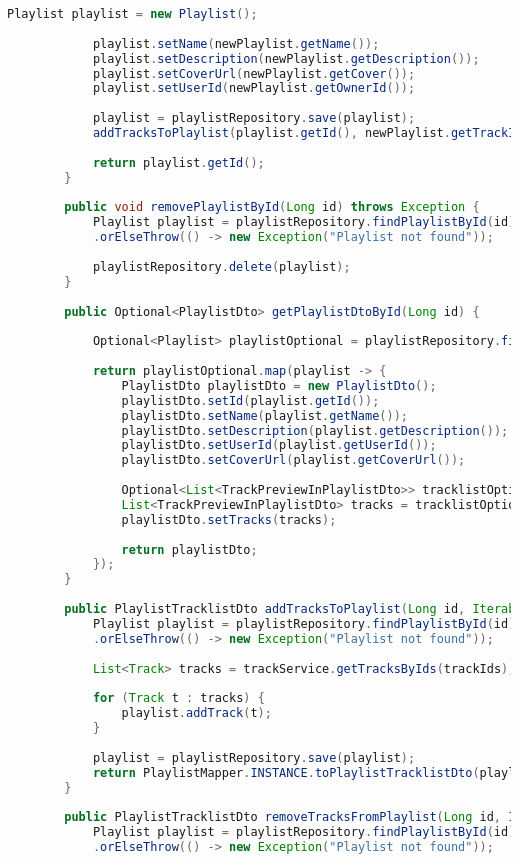 \begin{lstlisting}[language=java]
			Playlist playlist = new Playlist();
			
			playlist.setName(newPlaylist.getName());
			playlist.setDescription(newPlaylist.getDescription());
			playlist.setCoverUrl(newPlaylist.getCover());
			playlist.setUserId(newPlaylist.getOwnerId());
			
			playlist = playlistRepository.save(playlist);
			addTracksToPlaylist(playlist.getId(), newPlaylist.getTrackIds());
			
			return playlist.getId();
		}
		
		public void removePlaylistById(Long id) throws Exception {
			Playlist playlist = playlistRepository.findPlaylistById(id)
			.orElseThrow(() -> new Exception("Playlist not found"));
			
			playlistRepository.delete(playlist);
		}
		
		public Optional<PlaylistDto> getPlaylistDtoById(Long id) {
			
			Optional<Playlist> playlistOptional = playlistRepository.findPlaylistById(id);
			
			return playlistOptional.map(playlist -> {
				PlaylistDto playlistDto = new PlaylistDto();
				playlistDto.setId(playlist.getId());
				playlistDto.setName(playlist.getName());
				playlistDto.setDescription(playlist.getDescription());
				playlistDto.setUserId(playlist.getUserId());
				playlistDto.setCoverUrl(playlist.getCoverUrl());
				
				Optional<List<TrackPreviewInPlaylistDto>> tracklistOptional = trackService.getTracksWithCoverInPlaylist(id);
				List<TrackPreviewInPlaylistDto> tracks = tracklistOptional.orElseGet(ArrayList::new);
				playlistDto.setTracks(tracks);
				
				return playlistDto;
			});
		}
		
		public PlaylistTracklistDto addTracksToPlaylist(Long id, Iterable<Long> trackIds) throws Exception {
			Playlist playlist = playlistRepository.findPlaylistById(id)
			.orElseThrow(() -> new Exception("Playlist not found"));
			
			List<Track> tracks = trackService.getTracksByIds(trackIds);
			
			for (Track t : tracks) {
				playlist.addTrack(t);
			}
			
			playlist = playlistRepository.save(playlist);
			return PlaylistMapper.INSTANCE.toPlaylistTracklistDto(playlist);
		}
		
		public PlaylistTracklistDto removeTracksFromPlaylist(Long id, Iterable<Long> trackIds) throws Exception {
			Playlist playlist = playlistRepository.findPlaylistById(id)
			.orElseThrow(() -> new Exception("Playlist not found"));
			

\end{lstlisting}
